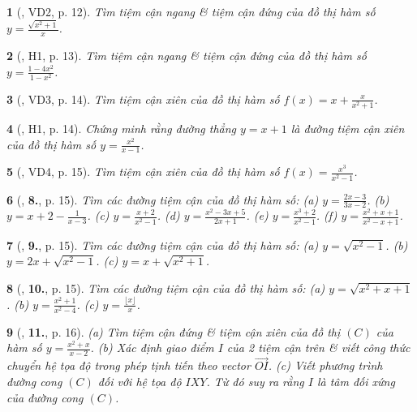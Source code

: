 \documentclass{article}
\newtheorem{baitoan}{}
\begin{document}
\begin{baitoan}[\cite{TLCT_giai_tich_12}, VD2, p. 12]
	Tìm tiệm cận ngang \& tiệm cận đứng của đồ thị hàm số $y = \frac{\sqrt{x^2 + 1}}{x}$.
\end{baitoan}

\begin{baitoan}[\cite{TLCT_giai_tich_12}, H1, p. 13]
	Tìm tiệm cận ngang \& tiệm cận đứng của đồ thị hàm số $y = \frac{1 - 4x^2}{1 - x^2}$.
\end{baitoan}

\begin{baitoan}[\cite{TLCT_giai_tich_12}, VD3, p. 14]
	Tìm tiệm cận xiên của đồ thị hàm số $f(x) = x + \frac{x}{x^2 + 1}$.
\end{baitoan}

\begin{baitoan}[\cite{TLCT_giai_tich_12}, H1, p. 14]
	Chứng minh rằng đường thẳng $y = x + 1$ là đường tiệm cận xiên của đồ thị hàm số $y = \frac{x^2}{x - 1}$.
\end{baitoan}

\begin{baitoan}[\cite{TLCT_giai_tich_12}, VD4, p. 15]
	Tìm tiệm cận xiên của đồ thị hàm số $f(x) = \frac{x^3}{x^2 - 1}$.
\end{baitoan}

\begin{baitoan}[\cite{TLCT_giai_tich_12}, \textbf{8.}, p. 15]
	Tìm các đường tiệm cận của đồ thị hàm số: (a) $y = \frac{2x - 3}{3x - 2}$. (b) $y = x + 2 - \frac{1}{x - 3}$. (c) $y = \frac{x + 2}{x^2 - 1}$. (d) $y = \frac{x^2 - 3x + 5}{2x + 1}$. (e) $y = \frac{x^3 + 2}{x^2 - 1}$. (f) $y = \frac{x^2 + x + 1}{x^2 - x + 1}$.	
\end{baitoan}

\begin{baitoan}[\cite{TLCT_giai_tich_12}, \textbf{9.}, p. 15]
	Tìm các đường tiệm cận của đồ thị hàm số: (a) $y = \sqrt{x^2 - 1}$. (b) $y = 2x + \sqrt{x^2 - 1}$. (c) $y = x + \sqrt{x^2 + 1}$.	
\end{baitoan}

\begin{baitoan}[\cite{TLCT_giai_tich_12}, \textbf{10.}, p. 15]
	Tìm các đường tiệm cận của đồ thị hàm số: (a) $y = \sqrt{x^2 + x + 1}$. (b) $y = \frac{x^2 + 1}{x^2 - 4}$. (c) $y = \frac{\lfloor x\rfloor}{x}$.	
\end{baitoan}

\begin{baitoan}[\cite{TLCT_giai_tich_12}, \textbf{11.}, p. 16]	
	(a) Tìm tiệm cận đứng \& tiệm cận xiên của đồ thị $(C)$ của hàm số $y = \frac{x^2 + x}{x - 2}$. (b) Xác định giao điểm $I$ của 2 tiệm cận trên \& viết công thức chuyển hệ tọa độ trong phép tịnh tiến theo vector $\overrightarrow{OI}$. (c) Viết phương trình đường cong $(C)$ đối với hệ tọa độ $IXY$. Từ đó suy ra rằng $I$ là tâm đối xứng của đường cong $(C)$.
\end{baitoan}
\end{document}
